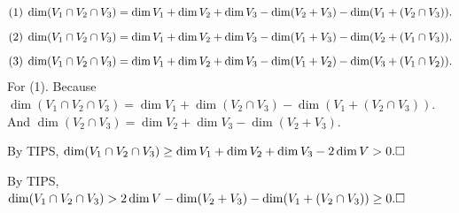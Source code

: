\documentclass[a4paper, 11pt, UTF8]{article}
\def\BulletPoint{{\small\bullet}}
\def\TIPS{{\tgnr\large T{\footnotesize IPS}}}
\def\Tips{{\tgbfx\large T{\footnotesize IPS:}}}
\begin{document}
\begin{large}
\BulletPoint \,\hspace{1pt}\Tips\vspace{-30pt}\TextB{}
$$(1)\;\dim(V_1\cap V_2\cap V_3)=\dim V_1+\dim V_2+\dim V_3-\dim(V_2+V_3)-\dim(V_1+(V_2\cap V_3)).\vspace{-46pt}$$\TextB{}
$$(2)\;\dim(V_1\cap V_2\cap V_3)=\dim V_1+\dim V_2+\dim V_3-\dim(V_1+V_3)-\dim(V_2+(V_1\cap V_3)).\vspace{-46pt}$$\TextB{}
$$(3)\;\dim(V_1\cap V_2\cap V_3)=\dim V_1+\dim V_2+\dim V_3-\dim(V_1+V_2)-\dim(V_3+(V_1\cap V_2)).\vspace{-6pt}$$\TextB{}
For (1). Because $\dim (V_1\cap V_2\cap V_3)=\dim V_1+\dim(V_2\cap V_3)-\dim(V_1+(V_2\cap V_3)).$\TextB{}
And $\dim(V_2\cap V_3)=\dim V_2+\dim V_3-\dim(V_2+V_3).$\par
\SepLine\par

By \TIPS, $\dim(V_1\cap V_2\cap V_3)\geq\dim V_1+\dim V_2+\dim V_3-2\dim V>0.\hfill\square$\par
\SepLine\par

By \TIPS, $\dim(V_1\cap V_2\cap V_3)>2\dim V-\dim(V_2+V_3)-\dim(V_1+(V_2\cap V_3))\geq 0.\hfill\square$\par
\SepLine\par


\end{large}
\end{document}
